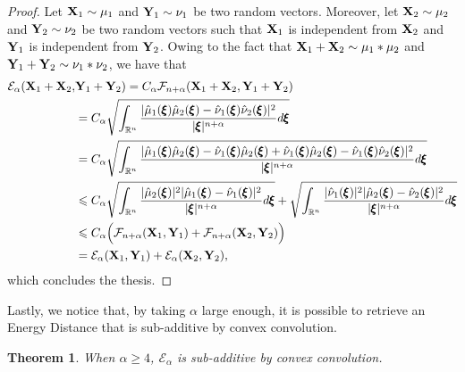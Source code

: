 \documentclass{article}
\renewcommand{\le}{\leqslant}
\renewcommand{\ge}{\geqslant}
\def\bX{{\bf X}}
\def\bY{{\bf Y}}
\def\bxi{{\pmb\xi}}
\def \erre{\mathbb{R}}
\newtheorem{theorem}{Theorem}
\newtheorem{proof}{Proof}
\begin{document}
\begin{proof}
    Let $\bX_1\sim\mu_1$ and $\bY_1\sim\nu_1$ be two random vectors.
    Moreover, let $\bX_2\sim\mu_2$ and $\bY_2\sim\nu_2$ be two random vectors such that $\bX_1$ is independent from $\bX_2$ and $\bY_1$ is independent from $\bY_2$.
    Owing to the fact that $\bX_1+\bX_2\sim \mu_1\ast\mu_2$ and $\bY_1+\bY_2\sim \nu_1\ast\nu_2$, we have that
    \begin{align*}
        \mathcal{E}_\alpha(\bX_1+\bX_2,&\bY_1+\bY_2)=C_\alpha\mathcal{F}_{n+\alpha}(\bX_1+\bX_2,\bY_1+\bY_2)\\
        &=C_\alpha\sqrt{\int_{\erre^n}\frac{|\hat\mu_1(\bxi)\hat\mu_2(\bxi)-\hat\nu_1(\bxi)\hat\nu_2(\bxi)|^2}{|\bxi|^{n+\alpha}}d\bxi}\\
        &=C_\alpha\sqrt{\int_{\erre^n}\frac{|\hat\mu_1(\bxi)\hat\mu_2(\bxi)-\hat\nu_1(\bxi)\hat\mu_2(\bxi)+\hat\nu_1(\bxi)\hat\mu_2(\bxi)-\hat\nu_1(\bxi)\hat\nu_2(\bxi)|^2}{|\bxi|^{n+\alpha}}d\bxi}\\
        &\le C_\alpha\sqrt{\int_{\erre^n}\frac{|\hat\mu_2(\bxi)|^2|\hat\mu_1(\bxi)-\hat\nu_1(\bxi)|^2}{|\bxi|^{n+\alpha}}d\bxi} +\sqrt{\int_{\erre^n}\frac{|\hat\nu_1(\bxi)|^2|\hat\mu_2(\bxi)-\hat\nu_2(\bxi)|^2}{|\bxi|^{n+\alpha}}d\bxi}\\
        &\le C_\alpha\Big(\mathcal{F}_{n+\alpha}(\bX_1,\bY_1)+\mathcal{F}_{n+\alpha}(\bX_2,\bY_2)\Big)\\
        &=\mathcal{E}_\alpha(\bX_1,\bY_1) + \mathcal{E}_\alpha(\bX_2,\bY_2),
    \end{align*}
    which concludes the thesis.
\end{proof}



Lastly, we notice that, by taking $\alpha$ large enough, it is possible to retrieve an Energy Distance that is sub-additive by convex convolution.

\begin{theorem}
    When $\alpha\ge 4$, $\mathcal{E}_\alpha$ is sub-additive by convex convolution.
\end{theorem}
\end{document}
